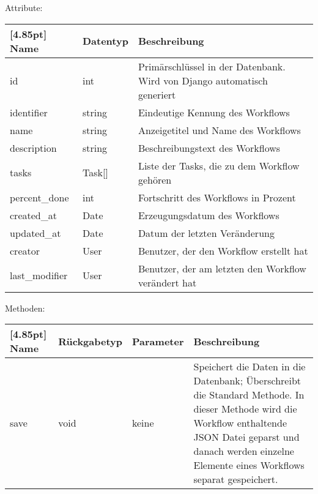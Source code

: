             Attribute:
            \begin{center}
            	\renewcommand{\arraystretch}{1.5}
	            \setlength\tabcolsep{5pt}
            	\begin{tabularx}{\textwidth}{|l|l|X|}
            		\hline
                    \rowcolor[gray]{0.75}[4.85pt]            		
            	    Name & Datentyp & Beschreibung \\ \hline
            		id & int & Primärschlüssel in der Datenbank. Wird von Django automatisch generiert \\ \hline
					identifier & string & Eindeutige Kennung des Workflows\\ \hline
					name & string & Anzeigetitel und Name des Workflows\\ \hline
					description & string & Beschreibungstext des Workflows\\ \hline				
					tasks & Task[] & Liste der Tasks, die zu dem Workflow gehören\\ \hline
					percent\_done & int & Fortschritt des Workflows in Prozent\\ \hline
					created\_at & Date & Erzeugungsdatum des Workflows \\ \hline
					updated\_at & Date & Datum der letzten Veränderung \\ \hline 
					creator & User & Benutzer, der den Workflow erstellt hat\\ \hline
					last\_modifier & User & Benutzer, der am letzten den Workflow verändert hat\\ \hline
            	\end{tabularx}
            \end{center}

        
             Methoden:
	        \begin{center}
	        	\setlength\tabcolsep{5pt}
	        	\renewcommand{\arraystretch}{1.5}
	        	
	        	\begin{tabularx}{\textwidth}{|l|l|l|X|}
	        		\hline
	        		\rowcolor[gray]{0.75}[4.85pt]
	        		Name & Rückgabetyp & Parameter & Beschreibung \\ \hline 
	        		save & void & keine & Speichert die Daten in die Datenbank; Überschreibt die Standard Methode. In dieser Methode wird die Workflow enthaltende JSON Datei geparst und danach werden einzelne Elemente eines Workflows separat gespeichert. \\ 
	        		\hline
	        	\end{tabularx}
	        \end{center}
